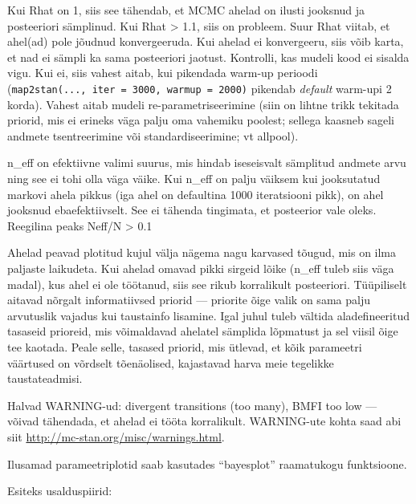 \documentclass[]{book}
\newenvironment{Shaded}{\begin{snugshade}}{\end{snugshade}}
\newcommand{\CommentTok}[1]{\textcolor[rgb]{0.56,0.35,0.01}{\textit{#1}}}
\newcommand{\DataTypeTok}[1]{\textcolor[rgb]{0.13,0.29,0.53}{#1}}
\newcommand{\DecValTok}[1]{\textcolor[rgb]{0.00,0.00,0.81}{#1}}
\newcommand{\FloatTok}[1]{\textcolor[rgb]{0.00,0.00,0.81}{#1}}
\newcommand{\KeywordTok}[1]{\textcolor[rgb]{0.13,0.29,0.53}{\textbf{#1}}}
\newcommand{\NormalTok}[1]{#1}
\newcommand{\OperatorTok}[1]{\textcolor[rgb]{0.81,0.36,0.00}{\textbf{#1}}}
\newcommand{\StringTok}[1]{\textcolor[rgb]{0.31,0.60,0.02}{#1}}
\begin{document}
Kui Rhat on 1, siis see tähendab, et MCMC ahelad on ilusti jooksnud ja posteeriori sämplinud.
Kui Rhat \textgreater{} 1.1, siis on probleem.
Suur Rhat viitab, et ahel(ad) pole jõudnud konvergeeruda.
Kui ahelad ei konvergeeru, siis võib karta, et nad ei sämpli ka sama posteeriori jaotust. Kontrolli, kas mudeli kood ei sisalda vigu.
Kui ei, siis vahest aitab, kui pikendada warm-up perioodi (\texttt{map2stan(...,\ iter\ =\ 3000,\ warmup\ =\ 2000)} pikendab \emph{default} warm-upi 2 korda).
Vahest aitab mudeli re-parametriseerimine (siin on lihtne trikk tekitada priorid, mis ei erineks väga palju oma vahemiku poolest; sellega kaasneb sageli andmete tsentreerimine või standardiseerimine; vt allpool).

n\_eff on efektiivne valimi suurus, mis hindab iseseisvalt sämplitud andmete arvu ning see ei tohi olla väga väike.
Kui n\_eff on palju väiksem kui jooksutatud markovi ahela pikkus (iga ahel on defaultina 1000 iteratsiooni pikk), on ahel jooksnud ebaefektiivselt.
See ei tähenda tingimata, et posteerior vale oleks.
Reegilina peaks Neff/N \textgreater{} 0.1

Ahelad peavad plotitud kujul välja nägema nagu karvased tõugud, mis on ilma paljaste laikudeta.
Kui ahelad omavad pikki sirgeid lõike (n\_eff tuleb siis väga madal), kus ahel ei ole töötanud, siis see rikub korralikult posteeriori.
Tüüpiliselt aitavad nõrgalt informatiivsed priorid --- priorite õige valik on sama palju arvutuslik vajadus kui taustainfo lisamine.
Igal juhul tuleb vältida aladefineeritud tasaseid prioreid, mis võimaldavad ahelatel sämplida lõpmatust ja sel viisil õige tee kaotada.
Peale selle, tasased priorid, mis ütlevad, et kõik parameetri väärtused on võrdselt tõenäolised, kajastavad harva meie tegelikke taustateadmisi.

Halvad WARNING-ud: divergent transitions (too many), BMFI too low --- võivad tähendada, et ahelad ei tööta korralikult. WARNING-ute kohta saad abi siit \url{http://mc-stan.org/misc/warnings.html}.

Ilusamad parameetriplotid saab kasutades ``bayesplot'' raamatukogu funktsioone.

Esiteks usalduspiirid:



\begin{Shaded}
\end{Shaded}
\end{document}
